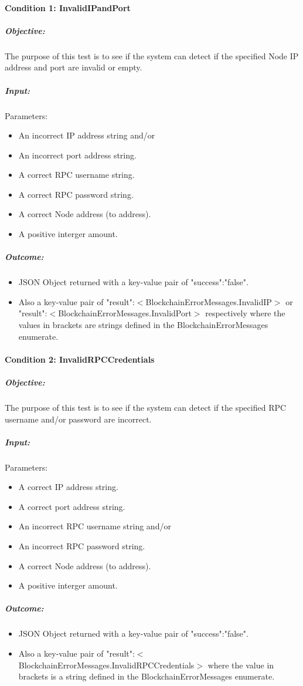 \documentclass[11pt]{article}
\begin{document}
	\paragraph{Condition 1: InvalidIPandPort}	
	\subparagraph{Objective:}
	The purpose of this test is to see if the system can detect if the specified Node IP address and port are invalid or empty.
	\subparagraph{Input:}
	Parameters:
	\begin{itemize}
		\item An incorrect IP address string and/or
		\item An incorrect port address string.
		\item A correct RPC username string.
		\item A correct RPC password string.
		\item A correct Node address (to address).
		\item A positive interger amount.
	\end{itemize}
	\subparagraph{Outcome:}
	\begin{itemize}
		\item JSON Object returned with a key-value pair of "success":"false".
		\item Also a key-value pair of "result":$<$BlockchainErrorMessages.InvalidIP$>$ or "result":$<$BlockchainErrorMessages.InvalidPort$>$ respectively where the values in brackets are strings defined in the BlockchainErrorMessages enumerate.
	\end{itemize}
	
	\paragraph{Condition 2: InvalidRPCCredentials}	
	\subparagraph{Objective:}
	The purpose of this test is to see if the system can detect if the specified RPC username and/or password are incorrect.
	\subparagraph{Input:}
	Parameters:
	\begin{itemize}
		\item A correct IP address string.
		\item A correct port address string.
		\item An incorrect RPC username string and/or
		\item An incorrect RPC password string.
		\item A correct Node address (to address).
		\item A positive interger amount.
	\end{itemize}
	\subparagraph{Outcome:}
	\begin{itemize}
		\item JSON Object returned with a key-value pair of "success":"false".
		\item Also a key-value pair of "result":$<$BlockchainErrorMessages.InvalidRPCCredentials$>$ where the value in brackets is a string defined in the BlockchainErrorMessages enumerate.
	\end{itemize}
\end{document}
